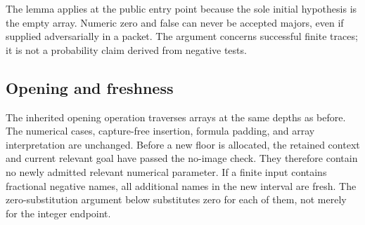 The lemma applies at the public entry point because the sole initial
hypothesis is the empty array.  Numeric zero and false can never be
accepted majors, even if supplied adversarially in a packet.  The
argument concerns successful finite traces; it is not a probability
claim derived from negative tests.

\subsection{Opening and freshness}

The inherited opening operation traverses arrays at the same depths as
before.  The numerical cases, capture-free insertion, formula padding,
and array interpretation are unchanged.  Before a new floor is allocated,
the retained context and current relevant goal have passed the no-image
check.  They therefore contain no newly admitted relevant numerical
parameter.  If a finite input contains fractional negative names, all
additional names in the new interval are fresh.  The zero-substitution
argument below substitutes zero for each of them, not merely for the
integer endpoint.

